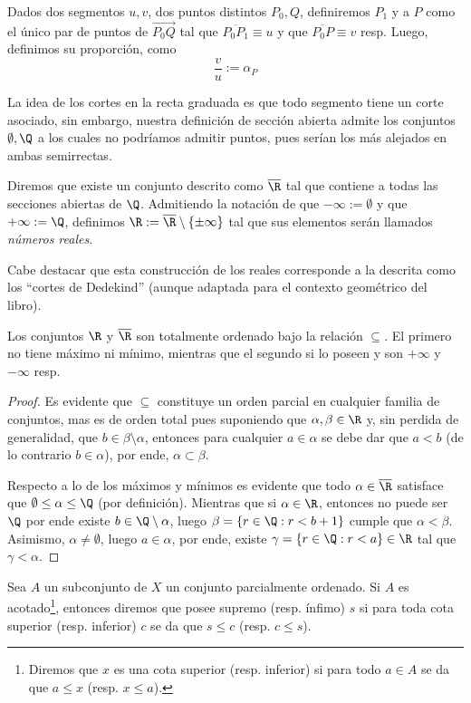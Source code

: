 \documentclass[11pt,a4paper]{book}
\begin{document}
\begin{mydef}
Dados dos segmentos $u,v$, dos puntos distintos $P_0,Q$, definiremos $P_1$ y a $P$ como el único par de puntos de $\overrightarrow{P_0Q}$ tal que $\overline{P_0P_1}\equiv u$ y que $\overline{P_0P}\equiv v$ resp. Luego, definimos su proporción, como
$$\frac{v}{u}:=\alpha_P$$
\end{mydef}
La idea de los cortes en la recta graduada es que todo segmento tiene un corte asociado, sin embargo, nuestra definición de sección abierta admite los conjuntos $\emptyset,\Q$ a los cuales no podríamos admitir puntos, pues serían los más alejados en ambas semirrectas.
\begin{mydef}
Diremos que existe un conjunto descrito como $\overline{\R}$ tal que contiene a todas las secciones abiertas de $\Q$. Admitiendo la notación de que $-\infty:=\emptyset$ y que $+\infty:=\Q$, definimos $\R:=\overline{\R}\setminus\{\pm\infty\}$ tal que sus elementos serán llamados \textit{números reales}.
\end{mydef}
Cabe destacar que esta construcción de los reales corresponde a la descrita como los ``cortes de Dedekind'' (aunque adaptada para el contexto geométrico del libro).
\begin{prop}
Los conjuntos $\R$ y $\overline{\R}$ son totalmente ordenado bajo la relación $\subseteq$. El primero no tiene máximo ni mínimo, mientras que el segundo si lo poseen y son $+\infty$ y $-\infty$ resp.
\end{prop}
\begin{proof}
Es evidente que $\subseteq$ constituye un orden parcial en cualquier familia de conjuntos, mas es de orden total pues suponiendo que $\alpha,\beta\in\R$ y, sin perdida de generalidad, que $b\in\beta\setminus\alpha$, entonces para cualquier $a\in\alpha$ se debe dar que $a<b$ (de lo contrario $b\in\alpha$), por ende, $\alpha\subset\beta$.

Respecto a lo de los máximos y mínimos es evidente que todo $\alpha\in\overline{\R}$ satisface que $\emptyset\leq\alpha\leq\Q$ (por definición). Mientras que si $\alpha\in\R$, entonces no puede ser $\Q$ por ende existe $b\in\Q\setminus\alpha$, luego $\beta=\{r\in\Q:r<b+1\}$ cumple que $\alpha<\beta$. Asimismo, $\alpha\neq\emptyset$, luego $a\in\alpha$, por ende, existe $\gamma=\{r\in\Q:r<a\}\in\R$ tal que $\gamma<\alpha$.
\end{proof}
\begin{mydef}
	Sea $A$ un subconjunto de $X$ un conjunto parcialmente ordenado. Si $A$ es acotado\footnote{Diremos que $x$ es una cota superior (resp. inferior) si para todo $a\in A$ se da que $a\leq x$ (resp. $x\leq a$).}, entonces diremos que posee supremo (resp. ínfimo) $s$ si para toda cota superior (resp. inferior) $c$ se da que $s\leq c$ (resp. $c\leq s$).
\end{mydef}
\end{document}
